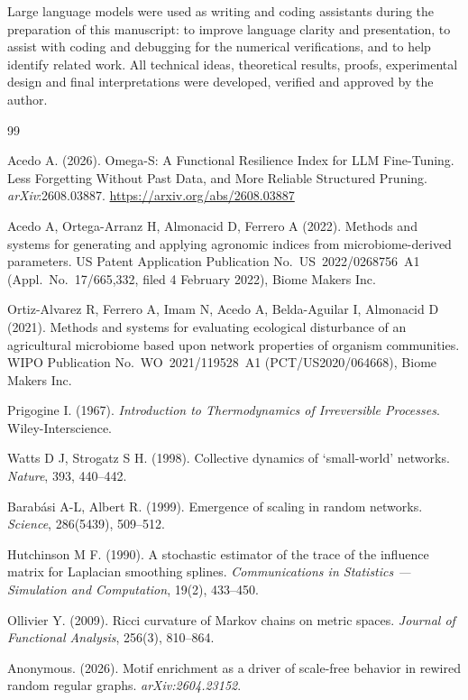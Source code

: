 \documentclass[11pt,a4paper]{article}
\begin{document}
Large language models were used as writing and coding assistants during the
preparation of this manuscript: to improve language clarity and
presentation, to assist with coding and debugging for the numerical
verifications, and to help identify related work. All technical ideas,
theoretical results, proofs, experimental design and final interpretations
were developed, verified and approved by the author.

\begin{thebibliography}{99}

Acedo A. (2026).
Omega-S: A Functional Resilience Index for LLM Fine-Tuning. Less Forgetting
Without Past Data, and More Reliable Structured Pruning.
\textit{arXiv}:2608.03887. \url{https://arxiv.org/abs/2608.03887}

Acedo A, Ortega-Arranz H, Almonacid D, Ferrero A (2022).
Methods and systems for generating and applying agronomic indices from
microbiome-derived parameters.
US Patent Application Publication No.\ US~2022/0268756~A1
(Appl.\ No.\ 17/665,332, filed 4 February 2022), Biome Makers Inc.

Ortiz-Alvarez R, Ferrero A, Imam N, Acedo A, Belda-Aguilar I, Almonacid D
(2021).
Methods and systems for evaluating ecological disturbance of an agricultural
microbiome based upon network properties of organism communities.
WIPO Publication No.\ WO~2021/119528~A1 (PCT/US2020/064668), Biome Makers Inc.

Prigogine I. (1967).
\textit{Introduction to Thermodynamics of Irreversible Processes}.
Wiley-Interscience.

Watts D J, Strogatz S H. (1998).
Collective dynamics of `small-world' networks.
\textit{Nature}, 393, 440--442.

Barabási A-L, Albert R. (1999).
Emergence of scaling in random networks.
\textit{Science}, 286(5439), 509--512.

Hutchinson M F. (1990).
A stochastic estimator of the trace of the influence matrix for
Laplacian smoothing splines.
\textit{Communications in Statistics --- Simulation and Computation},
19(2), 433--450.

Ollivier Y. (2009).
Ricci curvature of Markov chains on metric spaces.
\textit{Journal of Functional Analysis}, 256(3), 810--864.

Anonymous. (2026).
Motif enrichment as a driver of scale-free behavior in rewired random
regular graphs.
\textit{arXiv:2604.23152}.


\end{thebibliography}
\end{document}
